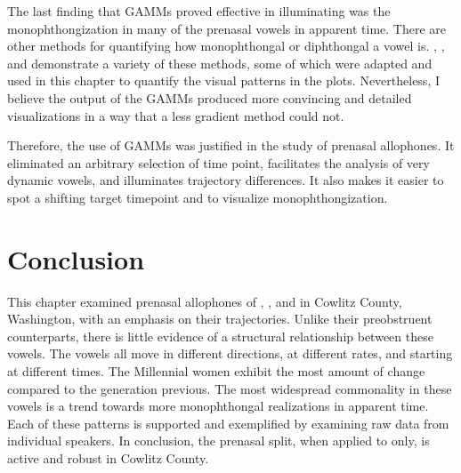 The last finding that GAMMs proved effective in illuminating was the monophthongization in many of the prenasal vowels in apparent time. There are other methods for quantifying how monophthongal or diphthongal a vowel is. \citet{morrison_2013}, \citet{jacewicz_etal_2006}, and \citet{farrington_etal_2018} demonstrate a variety of these methods, some of which were adapted and used in this chapter to quantify the visual patterns in the plots. Nevertheless, I believe the output of the GAMMs produced more convincing and detailed visualizations in a way that a less gradient method could not.

Therefore, the use of GAMMs was justified in the study of prenasal allophones. It eliminated an arbitrary selection of time point, facilitates the analysis of very dynamic vowels, and illuminates trajectory differences. It also makes it easier to spot a shifting target timepoint and to visualize monophthongization.

\section{Conclusion}
\label{sec:prenasal_conclusion}

This chapter examined prenasal allophones of \trap, \dress, and \kit in Cowlitz County, Washington, with an emphasis on their trajectories. Unlike their preobstruent counterparts, there is little evidence of a structural relationship between these vowels. The vowels all move in different directions, at different rates, and starting at different times. The Millennial women exhibit the most amount of change compared to the generation previous. The most widespread commonality in these vowels is a trend towards more monophthongal realizations in apparent time. Each of these patterns is supported and exemplified by examining raw data from individual speakers. In conclusion, the prenasal split, when applied to \trap only, is active and robust in Cowlitz County.
